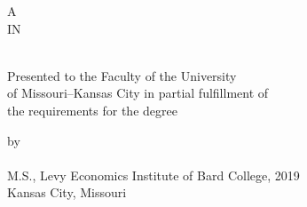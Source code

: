 %
%
\begin{center}
\thispagestyle{empty}   %

\setlength{\baselineskip}{28pt}
\vspace*{.1in}

\Large{
  \MakeUppercase{\MyThesisTitle}
} 
\normalsize

\setlength{\baselineskip}{13pt}
\vspace*{1.25in}

A \MakeUppercase{\ThesisOrDissertation}\\
IN\\
\vspace{0.1in}
\MyField\\
\vspace{0.5in}

Presented to the Faculty of the University\\
of Missouri--Kansas City in partial fulfillment of\\
the requirements for the degree

\vspace{0.5in}
\MakeUppercase{\MyDegree}
\vspace{0.95in}

by\\
\vspace{0.1in}
\MakeUppercase{\MyName}\\
\vspace{0.15in} 
M.S., Levy Economics Institute of Bard College, 2019\\

\vspace{1.5in}
Kansas City, Missouri\\
\MyDegreeAwardYear

\end{center}\newpage
